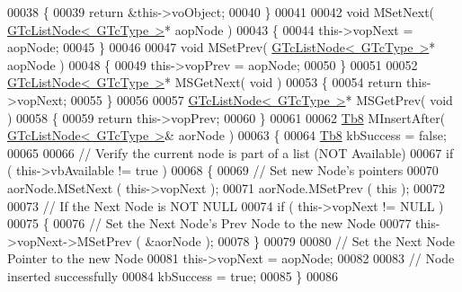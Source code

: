 \begin{DoxyCode}
00038          \{
00039             \textcolor{keywordflow}{return} &this->voObject;
00040          \}
00041 
00042          \textcolor{keywordtype}{void} MSetNext( \mbox{\hyperlink{class_g_n_common_1_1_n_containers_1_1_g_tc_list_node}{GTcListNode< GTcType >}}* aopNode )
00043          \{
00044             this->vopNext = aopNode;
00045          \}
00046 
00047          \textcolor{keywordtype}{void} MSetPrev( \mbox{\hyperlink{class_g_n_common_1_1_n_containers_1_1_g_tc_list_node}{GTcListNode< GTcType >}}* aopNode )
00048          \{
00049             this->vopPrev = aopNode;
00050          \}
00051 
00052          \mbox{\hyperlink{class_g_n_common_1_1_n_containers_1_1_g_tc_list_node}{GTcListNode< GTcType >}}* MSGetNext( \textcolor{keywordtype}{void} )
00053          \{
00054             \textcolor{keywordflow}{return} this->vopNext;
00055          \}
00056 
00057          \mbox{\hyperlink{class_g_n_common_1_1_n_containers_1_1_g_tc_list_node}{GTcListNode< GTcType >}}* MSGetPrev( \textcolor{keywordtype}{void} )
00058          \{
00059             \textcolor{keywordflow}{return} this->vopPrev;
00060          \}
00061 
00062          \mbox{\hyperlink{namespace_g_n_common_a8115dc7ed53b6e5b52e6bfde1632ea74}{Tb8}} MInsertAfter( \mbox{\hyperlink{class_g_n_common_1_1_n_containers_1_1_g_tc_list_node}{GTcListNode< GTcType >}}& aorNode )
00063          \{
00064             \mbox{\hyperlink{namespace_g_n_common_a8115dc7ed53b6e5b52e6bfde1632ea74}{Tb8}} kbSuccess = \textcolor{keyword}{false};
00065 
00066             \textcolor{comment}{// Verify the current node is part of a list (NOT Available)}
00067             \textcolor{keywordflow}{if} ( this->vbAvailable != \textcolor{keyword}{true} )
00068             \{
00069                \textcolor{comment}{// Set new Node's pointers}
00070                aorNode.MSetNext ( this->vopNext );
00071                aorNode.MSetPrev ( \textcolor{keyword}{this} );
00072 
00073                \textcolor{comment}{// If the Next Node is NOT NULL}
00074                \textcolor{keywordflow}{if} ( this->vopNext != NULL )
00075                \{
00076                   \textcolor{comment}{// Set the Next Node's Prev Node to the new Node}
00077                   this->vopNext->MSetPrev ( &aorNode );
00078                \}            
00079 
00080                \textcolor{comment}{// Set the Next Node Pointer to the new Node}
00081                this->vopNext = aopNode;
00082 
00083                \textcolor{comment}{// Node inserted successfully}
00084                kbSuccess = \textcolor{keyword}{true};
00085             \}
00086 

\end{DoxyCode}
